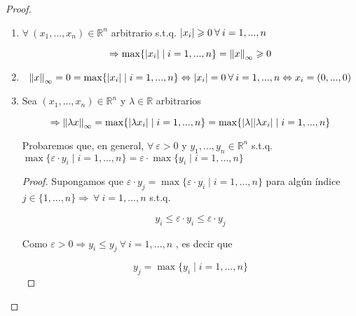 \documentclass[12pt]{article}
\newcommand{\subscript}[2]{$#1 _ #2$}
\newcommand\R{\ensuremath{\mathbb{R}}}
\begin{document}
\begin{enumerate}[label=\textbf{\arabic*}.]
\begin{proof}
\begin{enumerate}[label=(\subscript{N}{{\arabic*}})]
\item $\forall \: (x_1,...,x_n) \in \R^n$ arbitrario s.t.q. $\abs{{x}_{i}} \geqslant 0 \: \forall \: i = 1,...,n$

\begin{equation*}
    \Rightarrow  \max \{ \abs{{x}_{i}} \mid i = 1,...,n\} ={\norm{x}}_{\infty} \geqslant 0
\end{equation*}

\item 

\begin{equation*}
    {\norm{x}}_{\infty} = 0 = \max \{ \abs{{x}_{i}} \mid i = 1,...,n\} \Leftrightarrow \abs{{x}_{i}} = 0 \: \forall \: i = 1,...,n \Leftrightarrow {x}_{i} = (0,...,0)
\end{equation*}

\item Sea $(x_1,...,x_n) \in \R^n$ y $\lambda \in \R$ arbitrarios

\begin{equation*}
    \Rightarrow {\norm{\lambda x}}_{\infty}  = \max \{ \abs{{\lambda x}_{i}} \mid i = 1,...,n\} = \max \{ \abs{\lambda } \abs{{\lambda x}_{i}} \mid i = 1,...,n\}
\end{equation*}

\begin{lema}
    Probaremos que, en general, $\forall \: \varepsilon > 0 $ y $y_1,...,y_n \in \R^n$ s.t.q. $\max \{ \varepsilon \cdot y_i \mid i = 1,...,n\} = \varepsilon \cdot \max \{  y_i \mid i = 1,...,n\}$ 
\end{lema}

\begin{proof}
    Supongamos que $\varepsilon \cdot y_j = \max \{ \varepsilon \cdot y_i \mid i = 1,...,n\}$ para algún índice $j \in \{ 1,...,n \} \Rightarrow \: \forall \: i = 1,...,n $ s.t.q.

    \begin{equation*}
        y_i \leqslant \varepsilon \cdot y_i \leqslant \varepsilon \cdot y_j
    \end{equation*}

    Como $\varepsilon > 0 \Rightarrow y_i \leqslant y_j \: \forall \:   i = 1,...,n$ , es decir que

    \begin{equation*}
        y_j = \max \{ y_i \mid i = 1,...,n\}
    \end{equation*}


\end{proof}
\end{enumerate}
\end{proof}
\end{enumerate}
\end{document}
